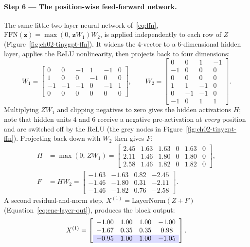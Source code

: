 \begin{deepdive}
\paragraph{Step 6 --- The position-wise feed-forward network.}
The same little two-layer neural network of~\eqref{eq:ffn},
$\mathrm{FFN}(\mathbf{z}) = \max(0,\, \mathbf{z} W_1) W_2$, is applied independently
to each row of $Z$ (Figure~\ref{fig:ch02-tinygpt-ffn}).  It widens the 4-vector to a
6-dimensional hidden layer, applies the ReLU nonlinearity, then projects back to four
dimensions:
\begin{equation*}
  W_1 =
  \begin{bmatrix}
     0 & 0 & -1 & 1 & -1 & 0\\
     1 & 0 & 0 & -1 & 0 & 0\\
    -1 & -1 & -1 & 0 & -1 & 1\\
     0 & 0 & 0 & 0 & 0 & 0
  \end{bmatrix},
  \qquad
  W_2 =
  \begin{bmatrix}
     0 & 0 & 1 & -1\\
    -1 & 0 & 0 & 0\\
     0 & 0 & 0 & 0\\
     1 & 1 & -1 & 0\\
     0 & -1 & -1 & 0\\
    -1 & 0 & 1 & 1
  \end{bmatrix}.
\end{equation*}
Multiplying $Z W_1$ and clipping negatives to zero gives the hidden activations $H$;
note that hidden units $4$ and $6$ receive a negative pre-activation at \emph{every}
position and are switched off by the ReLU (the grey nodes in
Figure~\ref{fig:ch02-tinygpt-ffn}).  Projecting back down with $W_2$ then gives $F$:
\begin{align*}
  H &= \max(0,\, Z W_1) =
  \begin{bmatrix}
    2.45 & 1.63 & 1.63 & 0 & 1.63 & 0\\
    2.11 & 1.46 & 1.80 & 0 & 1.80 & 0\\
    2.58 & 1.46 & 1.82 & 0 & 1.82 & 0
  \end{bmatrix},\\[4pt]
  F &= H W_2 =
  \begin{bmatrix}
    -1.63 & -1.63 & 0.82 & -2.45\\
    -1.46 & -1.80 & 0.31 & -2.11\\
    -1.46 & -1.82 & 0.76 & -2.58
  \end{bmatrix}.
\end{align*}
A second residual-and-norm step, $X^{(1)} = \mathrm{LayerNorm}(Z + F)$
(Equation~\eqref{eq:enc-layer-out}), produces the block output:
\begin{equation*}
  X^{(1)} =
  \left[\begin{array}{cccc}
    -1.00 & 1.00 & 1.00 & -1.00\\
    -1.67 & 0.35 & 0.35 & 0.98\\
    \rowcolor{blue!14} -0.95 & 1.00 & 1.00 & -1.05
  \end{array}\right].
\end{equation*}


\end{deepdive}
